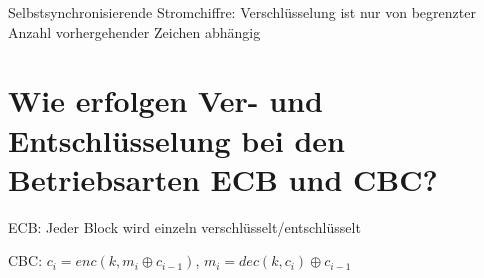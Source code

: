 \documentclass{article}
\begin{document}
	Selbstsynchronisierende Stromchiffre: Verschlüsselung ist nur von begrenzter Anzahl vorhergehender Zeichen abhängig
	
	\section*{Wie erfolgen Ver- und Entschlüsselung bei den Betriebsarten ECB und CBC?}
	ECB: Jeder Block wird einzeln verschlüsselt/entschlüsselt
	
	CBC: $c_i = enc(k, m_i \oplus c_{i-1})$, $m_i = dec(k, c_i) \oplus c_{i-1}$
	
\end{document}
